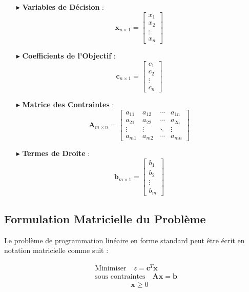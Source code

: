 \documentclass{report}
\begin{document}
\begin{multicols*}{2}
\begin{itemize}
    \item[$\blacktriangleright$] \textbf{Variables de Décision} :
    \[
    \mathbf{x}_{n \times 1} = 
    \begin{bmatrix}
    x_1 \\
    x_2 \\
    \vdots \\
    x_n
    \end{bmatrix}
    \]
    \item[$\blacktriangleright$] \textbf{Coefficients de l'Objectif} :
    \[
    \mathbf{c}_{n \times 1} = 
    \begin{bmatrix}
    c_1 \\
    c_2 \\
    \vdots \\
    c_n
    \end{bmatrix}
    \]
    \item[$\blacktriangleright$] \textbf{Matrice des Contraintes} :
    \[
    \mathbf{A}_{m \times n} = 
    \begin{bmatrix}
    a_{11} & a_{12} & \cdots & a_{1n} \\
    a_{21} & a_{22} & \cdots & a_{2n} \\
    \vdots & \vdots & \ddots & \vdots \\
    a_{m1} & a_{m2} & \cdots & a_{mn}
    \end{bmatrix}
    \]
    \item[$\blacktriangleright$] \textbf{Termes de Droite} :
    \[
    \mathbf{b}_{m \times 1} = 
    \begin{bmatrix}
    b_1 \\
    b_2 \\
    \vdots \\
    b_m
    \end{bmatrix}
    \]
\end{itemize}

\subsection{Formulation Matricielle du Problème}

Le problème de programmation linéaire en forme standard peut être écrit en notation matricielle comme suit :

\begin{align*}
& \text{Minimiser} \quad z = \mathbf{c}^T \mathbf{x} \\
& \text{sous contraintes} \quad \mathbf{A} \mathbf{x} = \mathbf{b} \\
& \quad \quad \quad \quad \quad \mathbf{x} \geq 0
\end{align*}


\end{multicols*}
\end{document}
